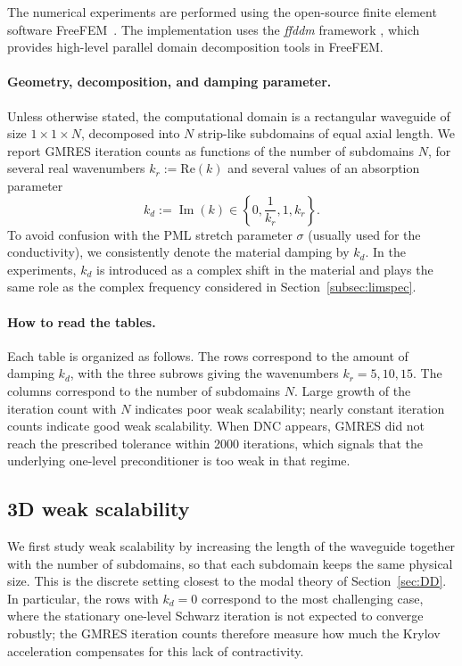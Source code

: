 \documentclass[smallextended]{svjour3}       %
\begin{document}
The numerical experiments are performed using the open-source finite element software
FreeFEM~\cite{Hecht:2012:FF}. The implementation uses the \textit{ffddm} framework
\cite{Tournier:2019:FFD}, which provides high-level parallel domain decomposition tools in
FreeFEM.

\paragraph{Geometry, decomposition, and damping parameter.}
Unless otherwise stated, the computational domain is a rectangular waveguide of size
\(1\times 1\times N\), decomposed into \(N\) strip-like subdomains of equal axial length. We
report GMRES iteration counts as functions of the number of subdomains \(N\), for several
real wavenumbers \(k_r := \text{Re}(k)\) and several values of an absorption parameter
\[
k_d := \operatorname{Im}(k)\in\left\{0,\frac{1}{k_r},1,k_r\right\}.
\]
To avoid confusion with the PML stretch parameter $\sigma$ (usually used for the conductivity), we consistently denote the material damping by
\(k_d\). In the experiments, \(k_d\) is introduced as a complex shift in the material and plays the
same role as the complex frequency considered in Section~\ref{subsec:limspec}.

\paragraph{How to read the tables.}
Each table is organized as follows. The rows correspond to the amount of damping \(k_d\), with the
three subrows giving the wavenumbers \(k_r=5,10,15\). The columns correspond to the number of
subdomains \(N\). Large growth of the iteration count with \(N\) indicates poor weak scalability;
nearly constant iteration counts indicate good weak scalability. When \textsf{DNC} appears, GMRES
did not reach the prescribed tolerance within 2000 iterations, which signals that the underlying
one-level preconditioner is too weak in that regime.

\subsection{3D weak scalability}
\label{subsec:weak3d}

We first study weak scalability by increasing the length of the waveguide together with the number
of subdomains, so that each subdomain keeps the same physical size. This is the discrete setting
closest to the modal theory of Section~\ref{sec:DD}. In particular, the rows with \(k_d=0\)
correspond to the most challenging case, where the stationary one-level Schwarz iteration is not
expected to converge robustly; the GMRES iteration counts therefore measure how much the Krylov
acceleration compensates for this lack of contractivity.
\end{document}
